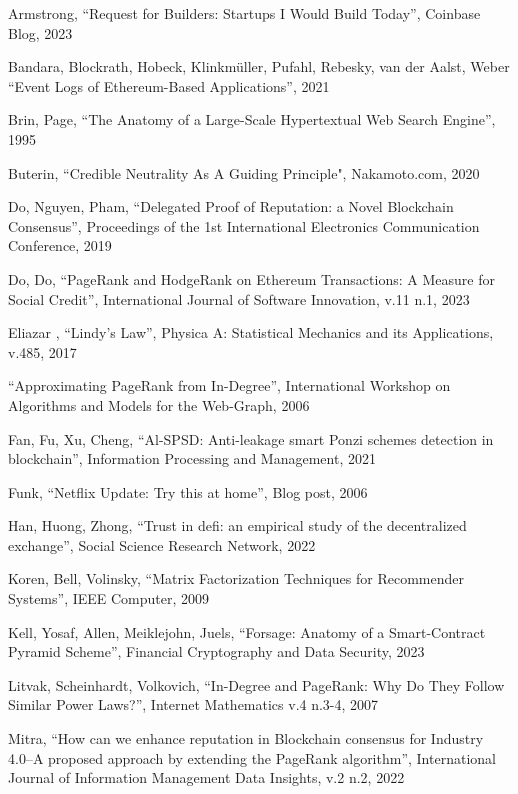 \documentclass[a4paper]{article}
\begin{document}
\begin{thebibliography}{Com79}

 Armstrong, ``Request for Builders: Startups I Would Build Today'', Coinbase Blog, 2023

 Bandara, Blockrath, Hobeck, Klinkmüller, Pufahl, Rebesky, van der Aalst, Weber ``Event Logs of Ethereum-Based Applications'', 2021

 Brin, Page, ``The Anatomy of a Large-Scale Hypertextual Web Search Engine'', 1995

 Buterin, ``Credible Neutrality As A Guiding Principle", Nakamoto.com, 2020

 Do, Nguyen, Pham, ``Delegated Proof of Reputation: a Novel Blockchain Consensus'', Proceedings of the 1st International Electronics Communication Conference, 2019

 Do, Do, ``PageRank and HodgeRank on Ethereum Transactions: A Measure for Social Credit'',  International Journal of Software Innovation, v.11 n.1, 2023

 Eliazar , ``Lindy's Law'', Physica A: Statistical Mechanics and its Applications, v.485, 2017

 ``Approximating PageRank from In-Degree'', International Workshop on Algorithms and Models for the Web-Graph, 2006

 Fan, Fu, Xu, Cheng, ``Al-SPSD: Anti-leakage smart Ponzi schemes detection in blockchain'', Information Processing and Management, 2021

 Funk, ``Netflix Update: Try this at home'', Blog post, 2006

Han, Huong, Zhong, ``Trust in defi: an empirical study of the decentralized exchange'', Social Science Research Network, 2022

 Koren, Bell, Volinsky, ``Matrix Factorization Techniques for Recommender Systems'', IEEE Computer, 2009

 Kell, Yosaf, Allen, Meiklejohn, Juels, ``Forsage: Anatomy of a Smart-Contract Pyramid Scheme'', Financial Cryptography and Data Security, 2023

 Litvak, Scheinhardt, Volkovich, ``In-Degree and PageRank:
Why Do They Follow Similar Power Laws?'', Internet Mathematics v.4 n.3-4, 2007

 Mitra, ``How can we enhance reputation in Blockchain consensus for Industry 4.0–A proposed approach by extending the PageRank algorithm'', International Journal of Information Management Data Insights, v.2 n.2, 2022


\end{thebibliography}
\end{document}
